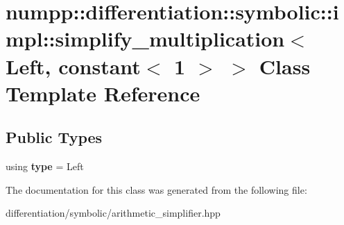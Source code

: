 \hypertarget{classnumpp_1_1differentiation_1_1symbolic_1_1impl_1_1simplify__multiplication_3_01Left_00_01constant_3_011_01_4_01_4}{}\section{numpp\+:\+:differentiation\+:\+:symbolic\+:\+:impl\+:\+:simplify\+\_\+multiplication$<$ Left, constant$<$ 1 $>$ $>$ Class Template Reference}
\label{classnumpp_1_1differentiation_1_1symbolic_1_1impl_1_1simplify__multiplication_3_01Left_00_01constant_3_011_01_4_01_4}
\subsection*{Public Types}
\begin{DoxyCompactItemize}
\item 
\mbox{\label{classnumpp_1_1differentiation_1_1symbolic_1_1impl_1_1simplify__multiplication_3_01Left_00_01constant_3_011_01_4_01_4_a4e7fb58a62be33766e50eab696dae108}} 
using {\bfseries type} = Left
\end{DoxyCompactItemize}


The documentation for this class was generated from the following file\+:\begin{DoxyCompactItemize}
\item 
differentiation/symbolic/arithmetic\+\_\+simplifier.\+hpp\end{DoxyCompactItemize}
